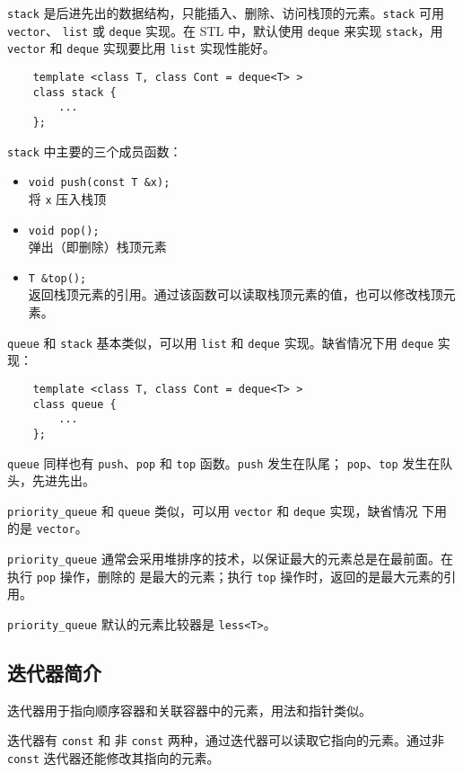 \documentclass[UTF8]{ctexart}
\begin{document}
\texttt{stack} 是后进先出的数据结构，只能插入、删除、访问栈顶的元素。\texttt{stack} 可用 \texttt{vector}、
\texttt{list} 或 \texttt{deque} 实现。在 STL 中，默认使用 \texttt{deque} 来实现 \texttt{stack}，用
\texttt{vector} 和 \texttt{deque} 实现要比用 \texttt{list} 实现性能好。
\begin{verbatim}
    template <class T, class Cont = deque<T> >
    class stack {
        ...
    };
\end{verbatim}

\texttt{stack} 中主要的三个成员函数：
\begin{itemize}
    \item \texttt{void push(const T \&x);} \\
    将 \texttt{x} 压入栈顶
    \item \texttt{void pop();} \\
    弹出（即删除）栈顶元素
    \item \texttt{T \&top();} \\
    返回栈顶元素的引用。通过该函数可以读取栈顶元素的值，也可以修改栈顶元素。
\end{itemize}

\texttt{queue} 和 \texttt{stack} 基本类似，可以用 \texttt{list} 和 \texttt{deque} 实现。缺省情况下用
\texttt{deque} 实现：
\begin{verbatim}
    template <class T, class Cont = deque<T> >
    class queue {
        ...
    };
\end{verbatim}

\texttt{queue} 同样也有 \texttt{push}、\texttt{pop} 和 \texttt{top} 函数。\texttt{push} 发生在队尾；
\texttt{pop}、\texttt{top} 发生在队头，先进先出。

\texttt{priority\_queue} 和 \texttt{queue} 类似，可以用 \texttt{vector} 和 \texttt{deque} 实现，缺省情况
下用的是 \texttt{vector}。

\texttt{priority\_queue} 通常会采用堆排序的技术，以保证最大的元素总是在最前面。在执行 \texttt{pop} 操作，删除的
是最大的元素；执行 \texttt{top} 操作时，返回的是最大元素的引用。

\texttt{priority\_queue} 默认的元素比较器是 \texttt{less<T>}。

\subsection{迭代器简介}
迭代器用于指向顺序容器和关联容器中的元素，用法和指针类似。

迭代器有 \texttt{const} 和 非 \texttt{const} 两种，通过迭代器可以读取它指向的元素。通过非
\texttt{const} 迭代器还能修改其指向的元素。
\end{document}
